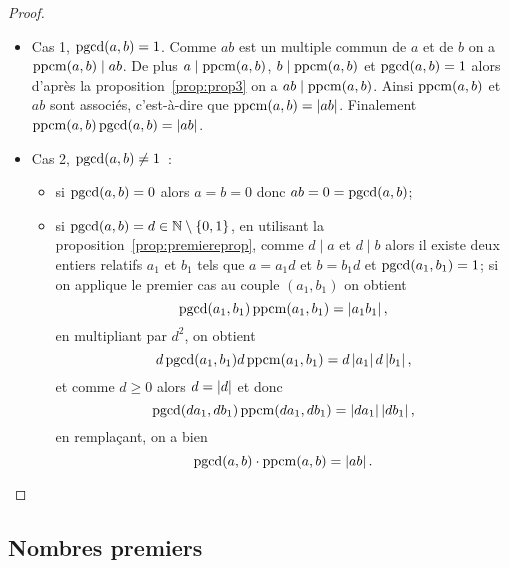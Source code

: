 \begin{proof}
  \begin{itemize}
    \item Cas 1, \(\operatorname{pgcd}(a,b)=1\). Comme \(ab\) est un multiple commun de \(a\)
      et de \(b\) on a \(\operatorname{ppcm}(a,b) \mid ab\). De plus \(a \mid \operatorname{ppcm}(a,b)\),
      \(b \mid \operatorname{ppcm}(a,b)\) et \(\operatorname{pgcd}(a,b)=1\) alors d'après la proposition~\ref{prop:prop3} on a \(ab \mid \operatorname{ppcm}(a,b)\). Ainsi \(\operatorname{ppcm}(a,b)\) et
      \(ab\) sont associés, c'est-à-dire que \(\operatorname{ppcm}(a,b)=\left\lvert ab\right\rvert\). Finalement
      \(\operatorname{ppcm}(a,b)\operatorname{pgcd}(a,b)=\left\lvert ab\right\rvert\).
    \item Cas 2, \(\operatorname{pgcd}(a,b) \neq 1\)~:
      \begin{itemize}
        \item si \(\operatorname{pgcd}(a,b) = 0\) alors \(a=b=0\) donc \(ab=0=\operatorname{pgcd}(a,b)\);
        \item si \(\operatorname{pgcd}(a,b)=d \in \mathbb{N}\setminus\{0,1\}\), en utilisant la
          proposition~\ref{prop:premiereprop}, comme \(d  \mid a\) et \(d \mid b\) alors il
          existe deux entiers relatifs \(a_1\) et \(b_1\) tels que \(a=a_1 d\)
          et \(b=b_1d\) et \(\operatorname{pgcd}(a_1,b_1)=1\); si on applique le premier cas
          au couple \((a_1,b_1)\) on obtient
          \begin{equation}
            \operatorname{pgcd}(a_1,b_1) \operatorname{ppcm}(a_1,b_1) = \left\lvert a_1b_1\right\rvert,
          \end{equation}
          en multipliant par \(d^2\), on obtient
          \begin{equation}
            d\operatorname{pgcd}(a_1,b_1) d\operatorname{ppcm}(a_1,b_1) = d\left\lvert a_1\right\rvert d\left\lvert b_1\right\rvert,
          \end{equation}
          et comme \(d\geqslant 0\) alors \(d=\left\lvert d\right\rvert\) et donc
          \begin{equation}
            \operatorname{pgcd}(da_1,db_1) \operatorname{ppcm}(da_1,db_1) = \left\lvert da_1\right\rvert \left\lvert db_1\right\rvert,
          \end{equation}
          en remplaçant, on a bien
          \begin{equation}
            \operatorname{pgcd}(a,b) \cdot \operatorname{ppcm}(a,b)= \left\lvert ab\right\rvert.
          \end{equation}
      \end{itemize}
  \end{itemize}
\end{proof}

\subsection{Nombres premiers}

